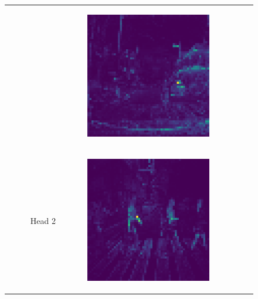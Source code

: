 \begin{figure}
\begin{tabular}{r p{\horspace} p{\horspace} p{\horspace}}
\begin{subfigure}[b]{\subfigwidth}
    \end{subfigure} 
    \hfill &
    \begin{subfigure}[b]{\subfigwidth}
        \includegraphics[width=\subfigwidth]{images/vit_attention/4/attn-head0.png}
    \end{subfigure} \\
    Head 2 &
    \begin{subfigure}[b]{\subfigwidth}
        \includegraphics[width=\subfigwidth]{images/vit_attention/1/attn-head1.png}

\end{subfigure}
\end{tabular}
\end{figure}
